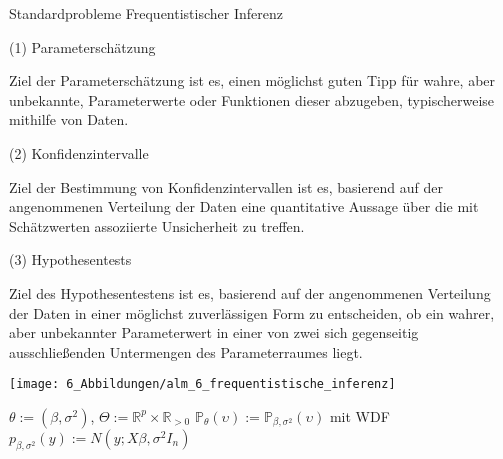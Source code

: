\documentclass[
  8pt,
  ignorenonframetext,
]{beamer}
\begin{document}
\begin{frame}{}
\protect\hypertarget{section-4}{}
Standardprobleme Frequentistischer Inferenz

\small
\vspace{2mm}

\noindent (1) Parameterschätzung

Ziel der Parameterschätzung ist es, einen möglichst guten Tipp für
wahre, aber unbekannte, Parameterwerte oder Funktionen dieser abzugeben,
typischerweise mithilfe von Daten.

\vspace{2mm}

\noindent (2) Konfidenzintervalle

Ziel der Bestimmung von Konfidenzintervallen ist es, basierend auf der
angenommenen Verteilung der Daten eine quantitative Aussage über die mit
Schätzwerten assoziierte Unsicherheit zu treffen.

\vspace{2mm}

\noindent (3) Hypothesentests

Ziel des Hypothesentestens ist es, basierend auf der angenommenen
Verteilung der Daten in einer möglichst zuverlässigen Form zu
entscheiden, ob ein wahrer, aber unbekannter Parameterwert in einer von
zwei sich gegenseitig ausschließenden Untermengen des Parameterraumes
liegt.
\end{frame}

\begin{frame}{}
\protect\hypertarget{section-5}{}
\center

\begin{center}\texttt{[image: 6\_Abbildungen/alm\_6\_frequentistische\_inferenz]} \end{center}
\center
\footnotesize

\(\theta := (\beta,\sigma^2)\),
\(\Theta := \mathbb{R}^p \times \mathbb{R}_{>0}\)
\(\mathbb{P}_\theta(\upsilon) := \mathbb{P}_{\beta,\sigma^2}(\upsilon)\)
mit WDF \(p_{\beta,\sigma^2}(y) := N(y;X\beta,\sigma^2I_n)\)
\end{frame}
\end{document}
